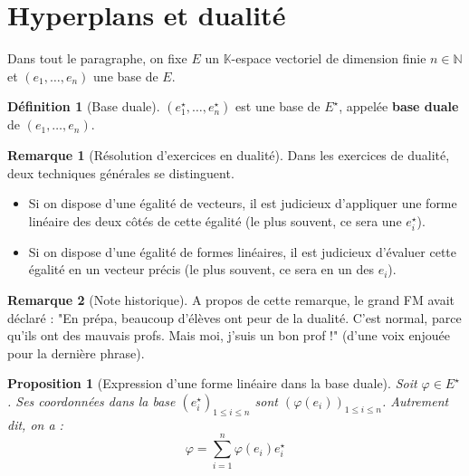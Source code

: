 \documentclass[french]{book}
\newcommand{\N}{\mathbb{N}}
\newcommand{\K}{\mathbb{K}}
\newcommand{\st}{^\star}
\theoremstyle{plain}
\newtheorem{prop}{Proposition}[chapter]
\theoremstyle{definition}
\newtheorem{dfn}{Définition}[chapter]
\newtheorem{rmq}{Remarque}[chapter]
\theoremstyle{remark}
\begin{document}
\section{Hyperplans et dualité}
Dans tout le paragraphe, on fixe $E$ un $\K$-espace vectoriel de dimension finie $n\in\N$ et $(e_1,\ldots,e_n)$ une base de $E$.
\begin{dfn}[Base duale]
	$(e_1\st,\ldots,e_n\st)$ est une base de $E\st$, appelée \textbf{base duale} de $(e_1,\ldots,e_n)$.
\end{dfn}
\begin{rmq}[Résolution d'exercices en dualité]
	Dans les exercices de dualité, deux techniques générales se distinguent.
	\begin{itemize}
		\item Si on dispose d'une égalité de vecteurs, il est judicieux d'appliquer une forme linéaire des deux côtés de cette égalité (le plus souvent, ce sera une $e_i\st$).
		\item Si on dispose d'une égalité de formes linéaires, il est judicieux d'évaluer cette égalité en un vecteur précis (le plus souvent, ce sera en un des $e_i$).
	\end{itemize}
\end{rmq}
\begin{rmq}[Note historique]
	A propos de cette remarque, le grand FM avait déclaré : "En prépa, beaucoup d'élèves ont peur de la dualité. C'est normal, parce qu'ils ont des mauvais profs. Mais moi, j'suis un bon prof !" (d'une voix enjouée pour la dernière phrase).
\end{rmq}
\begin{prop}[Expression d'une forme linéaire dans la base duale]
	Soit $\varphi\in E\st$. Ses coordonnées dans la base $(e_i\st)_{1\leqslant i\leqslant n}$ sont $(\varphi(e_i))_{1\leqslant i\leqslant n}$. Autrement dit, on a : $$\varphi=\sum_{i=1}^{n}\varphi(e_i)e_i\st$$
\end{prop}
\end{document}
